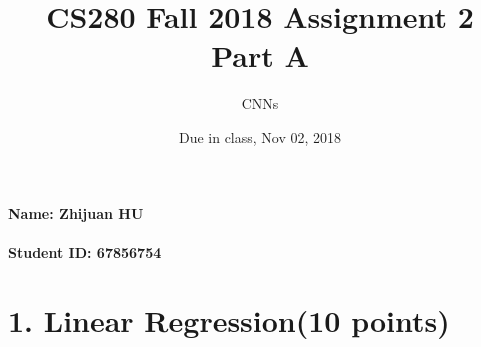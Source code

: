\documentclass[12pt]{article}%
\begin{document}
\title{CS280 Fall 2018 Assignment 2 \\ Part A}
\author{CNNs}
\date{Due in class, Nov 02, 2018}
\maketitle

\paragraph{Name: Zhijuan HU}

\paragraph{Student ID: 67856754}

\newpage

\section*{1. Linear Regression(10 points)}
\end{document}

